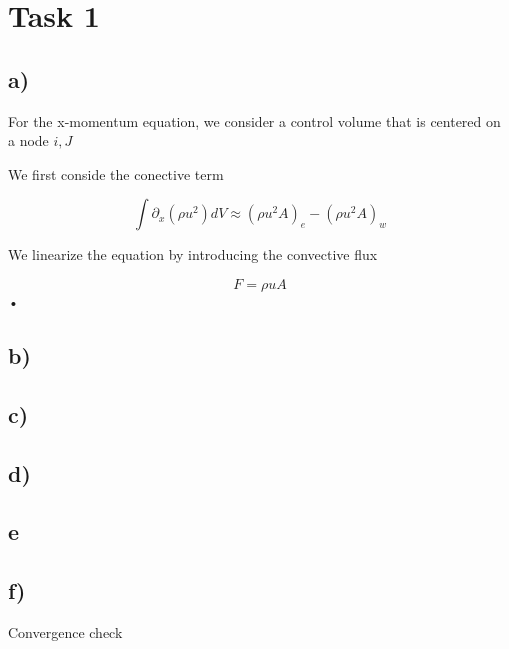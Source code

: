 \documentclass{article}
\begin{document}

\section{Task 1}

\subsection{a)}

For the x-momentum equation, we consider a control volume that is centered on a node $i,J$

We first conside the conective term

\begin{equation}
\int\partial_x (\rho u^2) dV \approx (\rho u^2 A)_e - (\rho u^2 A)_w
\end{equation}

We linearize the equation by introducing the convective flux

\begin{equation}
F = \rho u A
\end{equation}•

\subsection{b)}

\subsection{c)}

\subsection{d)}

\subsection{e}

\subsection{f)}
Convergence check
\end{document}
